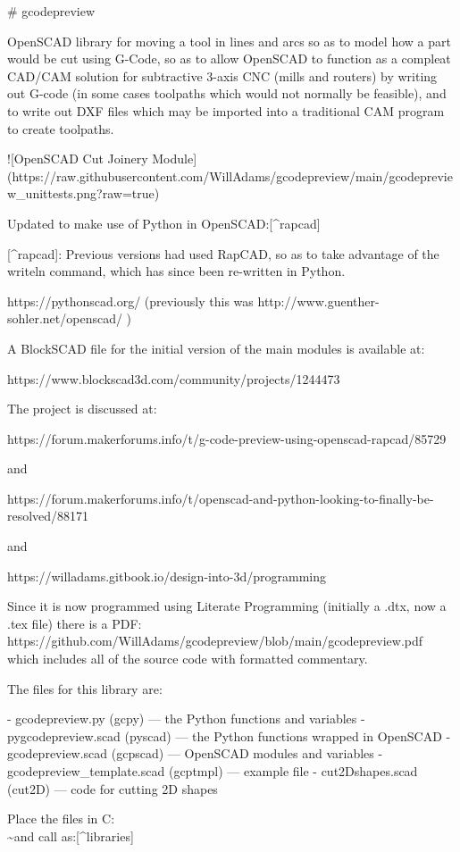 \documentclass{ltxdoc}
\begin{document}
\begin{readme}
# gcodepreview

OpenSCAD library for moving a tool in lines and arcs 
so as to model how a part would be cut using G-Code, 
so as to allow OpenSCAD to function as a compleat 
CAD/CAM solution for subtractive 3-axis CNC (mills  
and routers) by writing out G-code (in some cases 
toolpaths which would not normally be feasible), 
and to write out DXF files which may be imported 
into a traditional CAM program to create toolpaths.

![OpenSCAD Cut Joinery Module](https://raw.githubusercontent.com/WillAdams/gcodepreview/main/gcodepreview_unittests.png?raw=true)

Updated to make use of Python in OpenSCAD:[^rapcad]

[^rapcad]: Previous versions had used RapCAD, so as to take advantage of the writeln command, which has since been re-written in Python.

https://pythonscad.org/ (previously this was http://www.guenther-sohler.net/openscad/ )

A BlockSCAD file for the initial version of the 
main modules is available at:

https://www.blockscad3d.com/community/projects/1244473

The project is discussed at:

https://forum.makerforums.info/t/g-code-preview-using-openscad-rapcad/85729 

and

https://forum.makerforums.info/t/openscad-and-python-looking-to-finally-be-resolved/88171

and

https://willadams.gitbook.io/design-into-3d/programming

Since it is now programmed using Literate Programming 
(initially a .dtx, now a .tex file) there is a PDF:
https://github.com/WillAdams/gcodepreview/blob/main/gcodepreview.pdf
which includes all of the source code with formatted 
commentary.

The files for this library are:

 - gcodepreview.py (gcpy) --- the Python functions and variables
 - pygcodepreview.scad (pyscad) --- the Python functions wrapped in OpenSCAD
 - gcodepreview.scad (gcpscad) --- OpenSCAD modules and variables
 - gcodepreview_template.scad (gcptmpl) --- example file
 - cut2Dshapes.scad (cut2D) --- code for cutting 2D shapes 

Place the files in C:\Users\\\~\Documents\OpenSCAD\libraries and call as:[^libraries]


\end{readme}
\end{document}

